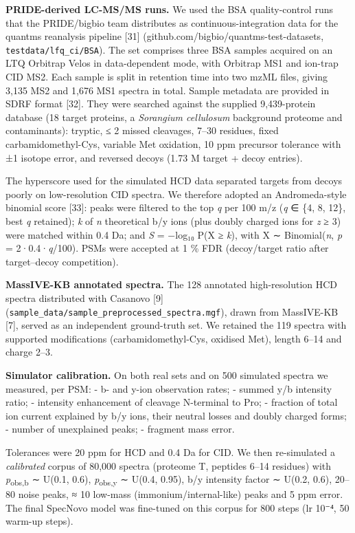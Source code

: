\documentclass[
]{article}
\begin{document}
\textbf{PRIDE-derived LC-MS/MS runs.} We used the BSA quality-control
runs that the PRIDE/bigbio team distributes as continuous-integration
data for the quantms reanalysis pipeline {[}31{]}
(github.com/bigbio/quantms-test-datasets,
\texttt{testdata/lfq\_ci/BSA}). The set comprises three BSA samples
acquired on an LTQ Orbitrap Velos in data-dependent mode, with Orbitrap
MS1 and ion-trap CID MS2. Each sample is split in retention time into
two mzML files, giving 3,135 MS2 and 1,676 MS1 spectra in total. Sample
metadata are provided in SDRF format {[}32{]}. They were searched
against the supplied 9,439-protein database (18 target proteins, a
\emph{Sorangium cellulosum} background proteome and contaminants):
tryptic, ≤ 2 missed cleavages, 7--30 residues, fixed
carbamidomethyl-Cys, variable Met oxidation, 10 ppm precursor tolerance
with ±1 isotope error, and reversed decoys (1.73 M target + decoy
entries).

The hyperscore used for the simulated HCD data separated targets from
decoys poorly on low-resolution CID spectra. We therefore adopted an
Andromeda-style binomial score {[}33{]}: peaks were filtered to the top
\emph{q} per 100 m/z (\emph{q} ∈ \{4, 8, 12\}, best \emph{q} retained);
\emph{k} of \emph{n} theoretical b/y ions (plus doubly charged ions for
\emph{z} ≥ 3) were matched within 0.4 Da; and \emph{S} = −log₁₀ P(X ≥
\emph{k}), with X ∼ Binomial(\emph{n}, \emph{p} = 2·0.4·\emph{q}/100).
PSMs were accepted at 1 \% FDR (decoy/target ratio after target--decoy
competition).

\textbf{MassIVE-KB annotated spectra.} The 128 annotated high-resolution
HCD spectra distributed with Casanovo {[}9{]}
(\texttt{sample\_data/sample\_preprocessed\_spectra.mgf}), drawn from
MassIVE-KB {[}7{]}, served as an independent ground-truth set. We
retained the 119 spectra with supported modifications
(carbamidomethyl-Cys, oxidised Met), length 6--14 and charge 2--3.

\textbf{Simulator calibration.} On both real sets and on 500 simulated
spectra we measured, per PSM: - b- and y-ion observation rates; - summed
y/b intensity ratio; - intensity enhancement of cleavage N-terminal to
Pro; - fraction of total ion current explained by b/y ions, their
neutral losses and doubly charged forms; - number of unexplained peaks;
- fragment mass error.

Tolerances were 20 ppm for HCD and 0.4 Da for CID. We then re-simulated
a \emph{calibrated} corpus of 80,000 spectra (proteome T, peptides 6--14
residues) with \emph{p}\textsubscript{obs,b} ∼ U(0.1, 0.6),
\emph{p}\textsubscript{obs,y} ∼ U(0.4, 0.95), b/y intensity factor ∼
U(0.2, 0.6), 20--80 noise peaks, ≈ 10 low-mass (immonium/internal-like)
peaks and 5 ppm error. The final SpecNovo model was fine-tuned on this
corpus for 800 steps (lr 10⁻⁴, 50 warm-up steps).
\end{document}
